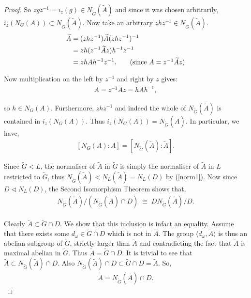 \documentclass[a4paper , 11pt]{book}
\theoremstyle{definition}
\theoremstyle{remark}
\begin{document}
\begin{proof}
So $z g z^{-1} = i_z(g) \in N_{\widetilde{G}}({\widetilde{A}})$ and since it was chosen arbitrarily, $i_z(N_G(A)) \subset N_{\widetilde{G}}({\widetilde{A}})$. Now take an arbitrary $z h z^{-1} \in N_{\widetilde{G}}({\widetilde{A}})$.
\begin{align*} {\widetilde{A}} &= (z h z^{-1}) {\widetilde{A}} (z h z^{-1})^{-1}
\\ &= z h (z^{-1} {\widetilde{A}} z) h^{-1} z^{-1}
\\ &= z h A h^{-1} z^{-1}. \tag{since $A = z^{-1} {\widetilde{A}} z$}
\end{align*}

Now multiplication on the left by $z^{-1}$ and right by $z$ gives:
\begin{align*} A = z^{-1} {\widetilde{A}} z = h A h^{-1},
\end{align*}

so $h \in N_G(A)$. Furthermore, $z h z^{-1}$ and indeed the whole of $N_{\widetilde{G}}({\widetilde{A}})$ is contained in $i_z(N_G(A))$. Thus $ i_z(N_G(A)) = N_{\widetilde{G}}({\widetilde{A}})$. In particular, we have,
\begin{align}\label{6.8iv1} [N_G(A): A] = [N_{\widetilde{G}}({\widetilde{A}}): {\widetilde{A}}].
\end{align}

Since ${\widetilde{G}} < L$, the normaliser of ${\widetilde{A}}$ in ${\widetilde{G}}$ is simply the normaliser of ${\widetilde{A}}$ in $L$ restricted to ${\widetilde{G}}$, thus $N_{\widetilde{G}}({\widetilde{A}}) < N_L({\widetilde{A}}) = N_L(D)$ by (\ref{norm1}). Now since $D \vartriangleleft N_L(D)$, the Second Isomorphism Theorem shows that,
\begin{align}\label{2iso} N_{\widetilde{G}}({\widetilde{A}})/( N_{\widetilde{G}}({\widetilde{A}}) \cap D) \; \cong \; DN_{\widetilde{G}}({\widetilde{A}}) / D.
\end{align}
\\
Clearly ${\widetilde{A}} \subset {\widetilde{G}} \cap D$. We show that this inclusion is infact an equality. Assume that there exists some $d_\omega \in  {\widetilde{G}} \cap D$ which is not in ${\widetilde{A}}$. The group $\langle d_\omega , {\widetilde{A}} \rangle$ is thus an abelian subgroup of ${\widetilde{G}}$, strictly larger than ${\widetilde{A}}$ and contradicting the fact that ${\widetilde{A}}$ is maximal abelian in ${\widetilde{G}}$. Thus ${\widetilde{A}} =  {\widetilde{G}} \cap D$. It is trivial to see that ${\widetilde{A}} \subset N_{\widetilde{G}}({\widetilde{A}}) \cap D$. Also $N_{\widetilde{G}}({\widetilde{A}}) \cap D \subset {\widetilde{G}} \cap D = {\widetilde{A}}$. So,
\begin{align}\label{parti} {\widetilde{A}} =  N_{\widetilde{G}}({\widetilde{A}}) \cap D.
\end{align}


\end{proof}
\end{document}
